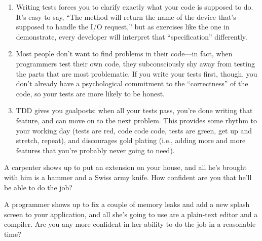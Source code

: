 \documentclass{report}
\begin{document}
\begin{enumerate}

  \item Writing tests forces you to clarify exactly what your code is
  supposed to do.  It's easy to say, ``The method will return the name
  of the device that's supposed to handle the I/O request,'' but as
  exercises like the one in \cite{b:ernst-chapin-groupthink}
  demonstrate, every developer will interpret that ``specification''
  differently.

  \item Most people don't want to find problems in their code---in
  fact, when programmers test their own code, they subconsciously shy
  away from testing the parts that are most problematic.  If you write
  your tests first, though, you don't already have a psychological
  commitment to the ``correctness'' of the code, so your tests are
  more likely to be honest.

  \item TDD gives you goalposts: when all your tests pass, you're done
  writing that feature, and can move on to the next problem.  This
  provides some rhythm to your working day (tests are red, code code
  code, tests are green, get up and stretch, repeat), and discourages
  gold plating (i.e., adding more and more features that you're
  probably never going to need).

\end{enumerate}




A carpenter shows up to put an extension on your house, and all he's
brought with him is a hammer and a Swiss army knife.  How confident
are you that he'll be able to do the job?

A programmer shows up to fix a couple of memory leaks and add a new
splash screen to your application, and all she's going to use are a
plain-text editor and a compiler.  Are you any more confident in her
ability to do the job in a reasonable time?
\end{document}
